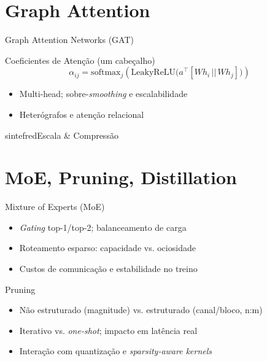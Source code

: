 \documentclass{beamer}
\begin{document}
\section{Graph Attention}
\begin{frame}{Graph Attention Networks (GAT)}
	\begin{block}{Coeficientes de Atenção (um cabeçalho)}
		\small
		\[
			\alpha_{ij}=\mathrm{softmax}_j\!\left(\mathrm{LeakyReLU}\!\big(a^\top[Wh_i \,||\, Wh_j]\big)\right)
		\]
	\end{block}
	\begin{itemize}[<+->]
		\item Multi-head; sobre-\textit{smoothing} e escalabilidade
		\item Heterógrafos e atenção relacional
	\end{itemize}
\end{frame}

\begin{chapter}{sintefred}{Escala \& Compressão}\end{chapter}

\section{MoE, Pruning, Distillation}
\begin{frame}{Mixture of Experts (MoE)}
	\begin{itemize}[<+->]
		\item \textit{Gating} top-1/top-2; balanceamento de carga
		\item Roteamento esparso: capacidade vs. ociosidade
		\item Custos de comunicação e estabilidade no treino
	\end{itemize}
\end{frame}

\begin{frame}{Pruning}
	\begin{itemize}[<+->]
		\item Não estruturado (magnitude) vs. estruturado (canal/bloco, n:m)
		\item Iterativo vs. \textit{one-shot}; impacto em latência real
		\item Interação com quantização e \textit{sparsity-aware kernels}
	\end{itemize}
\end{frame}
\end{document}
